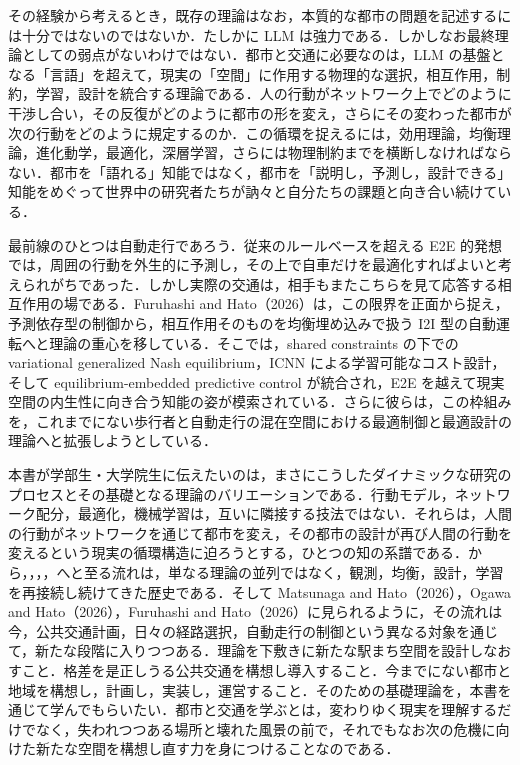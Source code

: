 その経験から考えるとき，既存の理論はなお，本質的な都市の問題を記述するには十分ではないのではないか．たしかに LLM は強力である．しかしなお最終理論としての弱点がないわけではない．都市と交通に必要なのは，LLM の基盤となる「言語」を超えて，現実の「空間」に作用する物理的な選択，相互作用，制約，学習，設計を統合する理論である．人の行動がネットワーク上でどのように干渉し合い，その反復がどのように都市の形を変え，さらにその変わった都市が次の行動をどのように規定するのか．この循環を捉えるには，効用理論，均衡理論，進化動学，最適化，深層学習，さらには物理制約までを横断しなければならない．都市を「語れる」知能ではなく，都市を「説明し，予測し，設計できる」知能をめぐって世界中の研究者たちが訥々と自分たちの課題と向き合い続けている．

最前線のひとつは自動走行であろう．従来のルールベースを超える E2E 的発想では，周囲の行動を外生的に予測し，その上で自車だけを最適化すればよいと考えられがちであった．しかし実際の交通は，相手もまたこちらを見て応答する相互作用の場である．Furuhashi and Hato（2026）は，この限界を正面から捉え，予測依存型の制御から，相互作用そのものを均衡埋め込みで扱う I2I 型の自動運転へと理論の重心を移している．そこでは，shared constraints の下での variational generalized Nash equilibrium，ICNN による学習可能なコスト設計，そして equilibrium-embedded predictive control が統合され，E2E を越えて現実空間の内生性に向き合う知能の姿が模索されている．さらに彼らは，この枠組みを，これまでにない歩行者と自動走行の混在空間における最適制御と最適設計の理論へと拡張しようとしている．

本書が学部生・大学院生に伝えたいのは，まさにこうしたダイナミックな研究のプロセスとその基礎となる理論のバリエーションである．行動モデル，ネットワーク配分，最適化，機械学習は，互いに隣接する技法ではない．それらは，人間の行動がネットワークを通じて都市を変え，その都市の設計が再び人間の行動を変えるという現実の循環構造に迫ろうとする，ひとつの知の系譜である．\citet{McFadden1974}から\citet{Wardrop1952}，\citet{Beckmann1956}，\citet{Sandholm2010}，\citet{Vaswani2017}，\citet{Raissi2019}へと至る流れは，単なる理論の並列ではなく，観測，均衡，設計，学習を再接続し続けてきた歴史である．そして Matsunaga and Hato（2026），Ogawa and Hato（2026），Furuhashi and Hato（2026）に見られるように，その流れは今，公共交通計画，日々の経路選択，自動走行の制御という異なる対象を通じて，新たな段階に入りつつある．理論を下敷きに新たな駅まち空間を設計しなおすこと．格差を是正しうる公共交通を構想し導入すること．今までにない都市と地域を構想し，計画し，実装し，運営すること．そのための基礎理論を，本書を通じて学んでもらいたい．都市と交通を学ぶとは，変わりゆく現実を理解するだけでなく，失われつつある場所と壊れた風景の前で，それでもなお次の危機に向けた新たな空間を構想し直す力を身につけることなのである．




